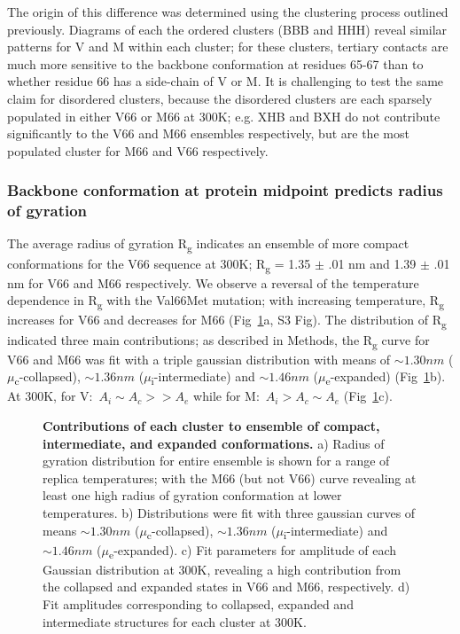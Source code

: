 \documentclass[10pt,letterpaper]{article}
\begin{document}
The origin of this difference was determined using the clustering process outlined previously. Diagrams of each the ordered clusters (BBB and HHH) reveal similar patterns for V and M within each cluster; for these clusters, tertiary contacts are much more sensitive to the backbone conformation at residues 65-67 than to whether residue 66 has a side-chain of V or M.  It is challenging to test the same claim for disordered clusters, because the disordered clusters are each sparsely populated in either V66 or M66 at 300K; e.g. XHB and BXH do not contribute significantly to the V66 and M66 ensembles respectively, but are the most populated cluster for M66 and V66 respectively.  



\subsubsection*{Backbone conformation at protein midpoint predicts radius of gyration}
The average radius of gyration R\textsubscript{g} indicates an ensemble of more compact conformations for the V66 sequence at 300K; R\textsubscript{g} = 1.35 $\pm$ .01 nm and 1.39 $\pm$ .01 nm for V66 and M66 respectively. We observe a reversal of the temperature dependence in R\textsubscript{g} with the Val66Met mutation; with increasing temperature, R\textsubscript{g} increases for V66 and decreases for M66 (Fig~\ref{fig6}a, S3 Fig). The distribution of R\textsubscript{g} indicated three main contributions; as described in Methods, the R\textsubscript{g} curve for V66 and M66 was fit with a triple gaussian distribution with means of $\sim1.30nm$ ($\mu$\textsubscript{c}-collapsed), $\sim1.36nm$ ($\mu$\textsubscript{i}-intermediate) and $\sim1.46nm$ ($\mu$\textsubscript{e}-expanded) (Fig~\ref{fig6}b). At 300K, for V:~$A_i\sim A_c >> A_{e}$ while for M:~$A_i> A_c \sim A_{e}$ (Fig~\ref{fig6}c).  

\begin{figure}[!h]

\caption{{\bf Contributions of each cluster to ensemble of compact, intermediate, and expanded conformations. }
a) Radius of gyration distribution for entire ensemble is shown for a range of replica temperatures; with the M66 (but not V66) curve revealing at least one high radius of gyration conformation at lower temperatures.  b) Distributions were fit with three gaussian curves of means $\sim1.30nm$ ($\mu$\textsubscript{c}-collapsed), $\sim1.36nm$ ($\mu$\textsubscript{i}-intermediate) and $\sim1.46nm$ ($\mu$\textsubscript{e}-expanded). c) Fit parameters for amplitude of each Gaussian distribution at 300K, revealing a high contribution from the collapsed and expanded states in V66 and M66, respectively. d) Fit amplitudes corresponding to collapsed, expanded and intermediate structures for each cluster at 300K. }
\label{fig6} 
\end{figure}
\end{document}
